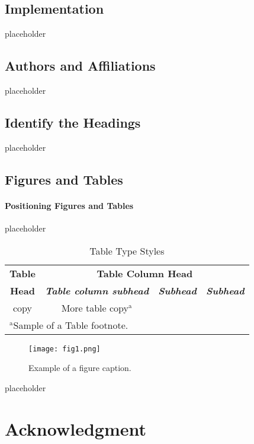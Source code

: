 \documentclass[conference]{IEEEtran}
\begin{document}
\subsection{Implementation}

placeholder


\subsection{Authors and Affiliations}
placeholder

\subsection{Identify the Headings}
placeholder

\subsection{Figures and Tables}
\paragraph{Positioning Figures and Tables} placeholder

\begin{table}[htbp]
\caption{Table Type Styles}
\begin{center}
\begin{tabular}{|c|c|c|c|}
\hline
\textbf{Table}&\multicolumn{3}{|c|}{\textbf{Table Column Head}} \\
\cline{2-4} 
\textbf{Head} & \textbf{\textit{Table column subhead}}& \textbf{\textit{Subhead}}& \textbf{\textit{Subhead}} \\
\hline
copy& More table copy$^{\mathrm{a}}$& &  \\
\hline
\multicolumn{4}{l}{$^{\mathrm{a}}$Sample of a Table footnote.}
\end{tabular}
\label{tab1}
\end{center}
\end{table}

\begin{figure}[htbp]
\centerline{\texttt{[image: fig1.png]}}
\caption{Example of a figure caption.}
\label{fig}
\end{figure}

placeholder

\section*{Acknowledgment}
\end{document}
